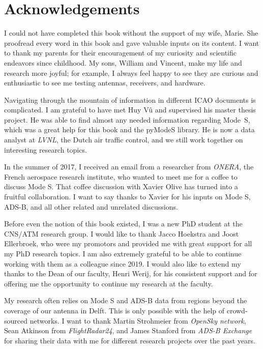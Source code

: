 \chapter*{Acknowledgements}

{
I could not have completed this book without the support of my wife, Marie. She proofread every word in this book and gave valuable inputs on its content. I want to thank my parents for their encouragement of my curiosity and scientific endeavors since childhood. My sons, William and Vincent, make my life and research more joyful; for example, I always feel happy to see they are curious and enthusiastic to see me testing antennas, receivers, and hardware.

Navigating through the mountain of information in different ICAO documents is complicated. I am grateful to have met Huy V\^u and supervised his master thesis project. He was able to find almost any needed information regarding Mode~S, which was a great help for this book and the pyModeS library. He is now a data analyst at \emph{LVNL}, the Dutch air traffic control, and we still work together on interesting research topics. 

In the summer of 2017, I received an email from a researcher from \emph{ONERA}, the French aerospace research institute, who wanted to meet me for a coffee to discuss Mode S. That coffee discussion with Xavier Olive has turned into a fruitful collaboration. I want to say thanks to Xavier for his inputs on Mode S, ADS-B, and all other related and unrelated discussions.

Before even the notion of this book existed, I was a new PhD student at the CNS/ATM research group. I would like to thank Jacco Hoekstra and Joost Ellerbroek, who were my promotors and provided me with great support for all my PhD research topics. I am also extremely grateful to be able to continue working with them as a colleague since 2019. I would also like to extend my thanks to the Dean of our faculty, Henri Werij, for his consistent support and for offering me the opportunity to continue my research at the faculty. 

My research often relies on Mode S and ADS-B data from regions beyond the coverage of our antenna in Delft. This is only possible with the help of crowd-sourced networks. I want to thank Martin Strohmeier from \emph{OpenSky network}, Sean Atkinson from \emph{FlightRadar24}, and James Stanford from \emph{ADS-B Exchange} for sharing their data with me for different research projects over the past years.

}
